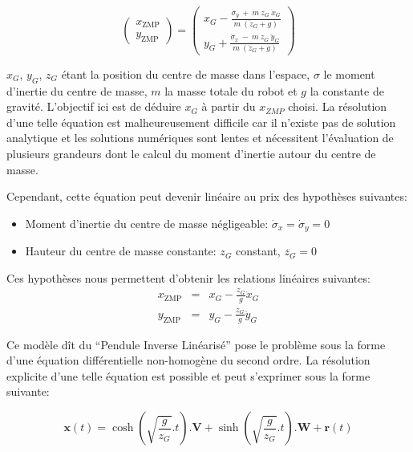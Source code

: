 \begin{equation}
\left(
\begin{array}{cc}
x_{\text{ZMP}}\\
y_{\text{ZMP}}
\end{array}
\right) = \left(
\begin{array}{cc}
x_G - \frac{\dot{\sigma}_y\ +\ m\ z_G\ \ddot{x}_G}{m\ (\ddot{z}_G + g)}\\
y_G + \frac{\dot{\sigma}_x\ -\ m\ z_G\ \ddot{y}_G}{m\ (\ddot{z}_G + g)}
\end{array}
\right)
\end{equation}

$x_G$, $y_G$, $z_G$ étant la position du centre de masse dans
l'espace, $\sigma$ le moment d'inertie du centre de masse, $m$ la
masse totale du robot et $g$ la constante de gravité. L'objectif ici
est de déduire $x_{G}$ à partir du $x_{ZMP}$ choisi. La résolution
d'une telle équation est malheureusement difficile car il n'existe pas
de solution analytique et les solutions numériques sont lentes et
nécessitent l'évaluation de plusieurs grandeurs dont le calcul du
moment d'inertie autour du centre de masse.

Cependant, cette équation peut devenir linéaire au prix des hypothèses suivantes:
\begin{itemize}
\item Moment d'inertie du centre de masse négligeable: $\dot{\sigma}_x = \dot{\sigma}_y = 0$
\item Hauteur du centre de masse constante: $z_G$ constant, $\ddot{z_G} = 0$
\end{itemize}

Ces hypothèses nous permettent d'obtenir les relations linéaires suivantes:
\begin{eqnarray*}
x_{\text{ZMP}} &=& x_G - \frac{z_G}{g} \ddot{x}_G\\
y_{\text{ZMP}} &=& y_G - \frac{z_G}{g} \ddot{y}_G
\end{eqnarray*}

Ce modèle dît du ``Pendule Inverse Linéarisé'' pose le problème sous
la forme d'une équation différentielle non-homogène du second
ordre. La résolution explicite d'une telle équation est possible et
peut s'exprimer sous la forme suivante:

\begin{equation}
  \mathbf{x}(t) = \cosh(\sqrt{\frac{g}{z_G}}.t) . \mathbf{V} + \sinh(\sqrt{\frac{g}{z_G}}.t) . \mathbf{W} + \mathbf{r}(t)
\end{equation}

